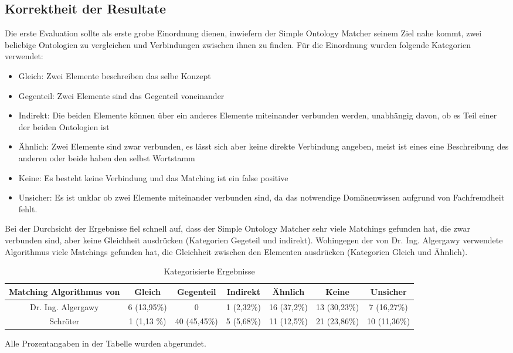 		\subsection{Korrektheit der Resultate}
		Die erste Evaluation sollte als erste grobe Einordnung dienen, inwiefern
		der Simple Ontology Matcher seinem Ziel nahe kommt, zwei beliebige Ontologien
		zu vergleichen und Verbindungen zwischen ihnen zu finden. Für die Einordnung
		wurden folgende Kategorien verwendet:\\
		\begin{itemize}
		  \item Gleich: Zwei Elemente beschreiben das selbe Konzept
		  \item Gegenteil: Zwei Elemente sind das Gegenteil voneinander
		  \item Indirekt: Die beiden Elemente können über ein anderes Elemente
		  miteinander verbunden werden, unabhängig davon, ob es Teil einer der beiden
		  Ontologien ist
		  \item Ähnlich: Zwei Elemente sind zwar verbunden, es lässt sich aber keine
		  direkte Verbindung angeben, meist ist eines eine Beschreibung des anderen
		  oder beide haben den selbst Wortstamm
		  \item Keine: Es besteht keine Verbindung und das Matching ist ein false
		  positive
		  \item Unsicher: Es ist unklar ob zwei Elemente miteinander verbunden sind,
		  da das notwendige Domänenwissen aufgrund von Fachfremdheit fehlt.
		\end{itemize}
		
		Bei der Durchsicht der Ergebnisse fiel schnell auf, dass der Simple Ontology
		Matcher sehr viele Matchings gefunden hat, die zwar verbunden sind, aber keine
		Gleichheit ausdrücken (Kategorien Gegeteil und indirekt).
		Wohingegen der von Dr. Ing. Algergawy verwendete Algorithmus viele Matchings
		gefunden hat, die Gleichheit zwischen den Elementen ausdrücken (Kategorien
		Gleich und Ähnlich).\\
		
		\begin{table}[h!]
		\centering
		\small
		\setlength\tabcolsep{2pt}
		\caption{Kategorisierte Ergebnisse}
		\begin{tabular}{|c|c|c|c|c|c|c|}\hline
		Matching Algorithmus von & Gleich & Gegenteil & Indirekt & Ähnlich & Keine &
		Unsicher \\\hline
		Dr. Ing. Algergawy & 6 (13,95\%) & 0 & 1 (2,32\%) & 16 (37,2\%) & 13
		(30,23\%) & 7 (16,27\%) \\\hline
		Schröter & 1 (1,13 \%) & 40 (45,45\%) & 5 (5,68\%) & 11 (12,5\%) & 21
		(23,86\%) & 10 (11,36\%) \\\hline
		\end{tabular}
		\end{table}
		Alle Prozentangaben in der Tabelle wurden abgerundet.\\
				
